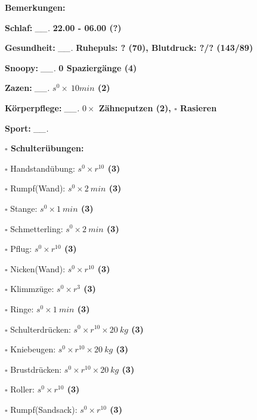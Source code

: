 \documentclass[10pt,a4paper]{article}
\newcommand\prop[1] {{\color {alizarin} {\bf #1}}}             %
\newcommand\mand[1] {{\color {burntorange} {\bf #1}}}          %
\newcommand\topspace{\vskip -15pt \hskip 20pt}
\newcommand\n[1] { {\sl #1.} \hskip 5pt }
\begin{document}
\begin{mdframed}[style=daystyle]
  \begin{labeling}{{\mand {Bemerkungen:}}}
    \setlength\itemsep{-3pt}
  \item[{\mand {Schlaf:}}]       \n{\_\_} {\prop {22.00 - 06.00 (?)}}
  \item[{\mand {Gesundheit:}}]   \n{\_\_} {\prop {Ruhepuls: ? (70), Blutdruck: ?/? (143/89)}}
  \item[{\mand {Snoopy:}}]       \n{\_\_} {\prop {0 Spaziergänge (4)}}    
  \item[{\mand {Zazen:}}]        \n{\_\_} {\prop {$s^0 \times\ 10 min$ (2)}}
  \item[{\mand {Körperpflege:}}] \n{\_\_} {\prop {$0 \times$ Zähneputzen (2), $\square$ Rasieren}}
  \item[{\mand {Sport:}}]        \n{\_\_}
    \topspace
    \begin{minipage}{0.75\textwidth}  
      \begin{labeling}{\prop {$\square$ {Schulterübungen:}}} 
        \setlength\itemsep{-3pt}
      \item[$\square$ Handstandübung:]  {\prop {$s^0 \times r^{10}$ (3)}}
      \item[$\square$ Rumpf(Wand):]     {\prop {$s^0 \times 2\ min$ (3)}}
      \item[$\square$ Stange:]          {\prop {$s^0 \times 1\ min$ (3)}}
      \item[$\square$ Schmetterling:]   {\prop {$s^0 \times 2\ min$ (3)}}
      \item[$\square$ Pflug:]           {\prop {$s^0 \times r^{10}$ (3)}}
      \item[$\square$ Nicken(Wand):]    {\prop {$s^0 \times r^{10}$ (3)}}
      \item[$\square$ Klimmzüge:]       {\prop {$s^0 \times r^3$ (3)}}
      \item[$\square$ Ringe:]           {\prop {$s^0 \times 1\ min$ (3)}}
      \item[$\square$ Schulterdrücken:] {\prop {$s^0 \times r^{10} \times 20\ kg$ (3)}}
      \item[$\square$ Kniebeugen:]      {\prop {$s^0 \times r^{10} \times 20\ kg$ (3)}}
      \item[$\square$ Brustdrücken:]    {\prop {$s^0 \times r^{10} \times 20\ kg$ (3)}}
      \item[$\square$ Roller:]          {\prop {$s^0 \times r^{10}$ (3)}}
      \item[$\square$ Rumpf(Sandsack):] {\prop {$s^0 \times r^{10}$ (3)}}

\end{labeling}
\end{minipage}
\end{labeling}
\end{mdframed}
\end{document}
